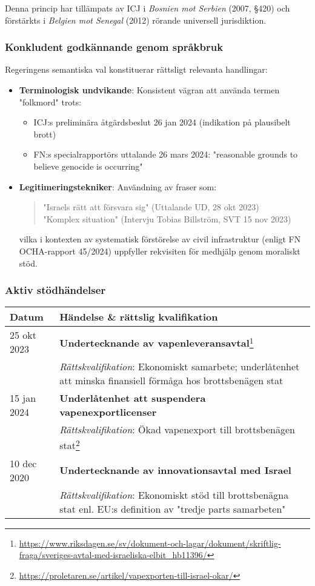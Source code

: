 Denna princip har tillämpats av ICJ i \textit{Bosnien mot Serbien} (2007, §420) och förstärkts i \textit{Belgien mot Senegal} (2012) rörande universell jurisdiktion.

\subsubsection{Konkludent godkännande genom språkbruk}
Regeringens semantiska val konstituerar rättsligt relevanta handlingar:

\begin{itemize}
    \item \textbf{Terminologisk undvikande}: Konsistent vägran att använda termen "folkmord" trots:
    \begin{itemize}
        \item ICJ:s preliminära åtgärdsbeslut 26 jan 2024 (indikation på plausibelt brott)
        \item FN:s specialrapportörs uttalande 26 mars 2024: "reasonable grounds to believe genocide is occurring"
    \end{itemize}
    
    \item \textbf{Legitimeringstekniker}: Användning av fraser som:
    \begin{quote}
        "Israels rätt att försvara sig" (Uttalande UD, 28 okt 2023)\\
        "Komplex situation" (Intervju Tobias Billström, SVT 15 nov 2023)
    \end{quote}
    vilka i kontexten av systematisk förstörelse av civil infrastruktur (enligt FN OCHA-rapport 45/2024) uppfyller rekvisiten för medhjälp genom moraliskt stöd.
\end{itemize}

\subsubsection{Aktiv stödhändelser}
\begin{tabular}{p{}p{}}
\textbf{Datum} & \textbf{Händelse \& rättslig kvalifikation} \\
\hline
25 okt 2023 & \textbf{Undertecknande av vapenleveransavtal}\footnote{\url{https://www.riksdagen.se/sv/dokument-och-lagar/dokument/skriftlig-fraga/sveriges-avtal-med-israeliska-elbit_hb11396/}} \\
& \footnotesize\textit{Rättskvalifikation}: Ekonomiskt samarbete; underlåtenhet att minska finansiell förmåga hos brottsbenägen stat \\
\hline
15 jan 2024 & \textbf{Underlåtenhet att suspendera vapenexportlicenser} \\
& \footnotesize\textit{Rättskvalifikation}: Ökad vapenexport till brottsbenägen stat\footnote{\url{https://proletaren.se/artikel/vapexporten-till-israel-okar/}} \\
\hline
10 dec 2020 & \textbf{Undertecknande av innovationsavtal med Israel} \\
& \footnotesize\textit{Rättskvalifikation}: Ekonomiskt stöd till brottsbenägna stat enl. EU:s definition av "tredje parts samarbeten" \\
\end{tabular}

